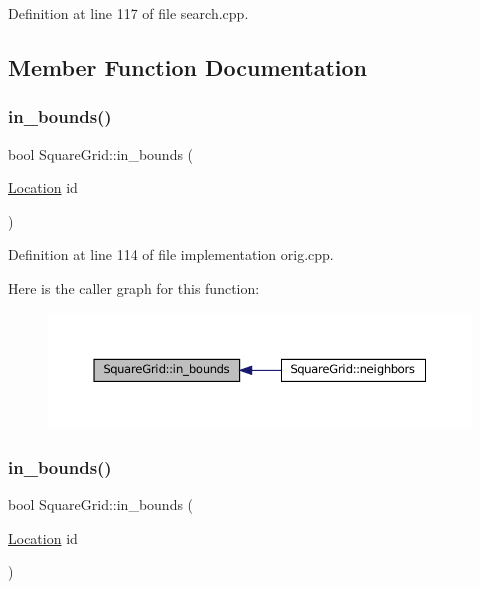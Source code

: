 Definition at line 117 of file search.\+cpp.



\subsection{Member Function Documentation}
\mbox{\label{struct_square_grid_a84bbaa9dad618228a2d6d3196254b86b}} 
\subsubsection{\texorpdfstring{in\+\_\+bounds()}{in\_bounds()}\hspace{0.1cm}{\footnotesize\ttfamily [1/2]}}
{\footnotesize\ttfamily bool Square\+Grid\+::in\+\_\+bounds (\begin{DoxyParamCaption}\item[{\mbox{\hyperlink{struct_square_grid_a2c9a2cbd3912aa48ac97289abc3f1c0f}{Location}}}]{id }\end{DoxyParamCaption})\hspace{0.3cm}{\ttfamily [inline]}}



Definition at line 114 of file implementation orig.\+cpp.

Here is the caller graph for this function\+:\nopagebreak
\begin{figure}[H]
\begin{center}
\leavevmode
\includegraphics[width=350pt]{struct_square_grid_a84bbaa9dad618228a2d6d3196254b86b_icgraph}
\end{center}
\end{figure}
\mbox{\label{struct_square_grid_a84bbaa9dad618228a2d6d3196254b86b}} 
\subsubsection{\texorpdfstring{in\+\_\+bounds()}{in\_bounds()}\hspace{0.1cm}{\footnotesize\ttfamily [2/2]}}
{\footnotesize\ttfamily bool Square\+Grid\+::in\+\_\+bounds (\begin{DoxyParamCaption}\item[{\mbox{\hyperlink{struct_square_grid_a2c9a2cbd3912aa48ac97289abc3f1c0f}{Location}}}]{id }\end{DoxyParamCaption})\hspace{0.3cm}{\ttfamily [inline]}}



